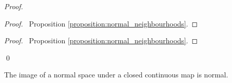 \begin{proof}
    \pf
    \begin{proof}
        \pf\ Proposition \ref{proposition:normal_neighbourhoods}.
    \end{proof}
    \begin{proof}
        \pf\ Proposition \ref{proposition:normal_neighbourhoods}.
    \end{proof}
    \qed
\end{proof}

\begin{proposition}
    \label{proposition:closed_continuous_image_normal}
    The image of a normal space under a closed continuous map is normal.
\end{proposition}

